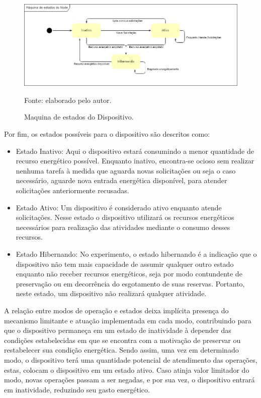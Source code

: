 \begin{figure}[H]
	\centering
	
	\caption{Maquina de estados do Dispositivo.}
	\label{fig:cap6maquinaestados}
	\noindent\includegraphics[width=0.75\linewidth]{Imagens/cap6/cap6maquinaestados.jpg} 
	
	Fonte: elaborado pelo autor.
\end{figure}

Por fim, os estados possíveis para o dispositivo são descritos como:
\begin{itemize}
	\item Estado Inativo: Aqui o dispositivo estará consumindo a menor quantidade de recurso energético possível. Enquanto inativo, encontra-se ocioso sem realizar nenhuma tarefa à medida que aguarda novas solicitações ou seja o caso necessário, aguarde nova entrada energética disponível, para atender solicitações anteriormente recusadas.
	\item Estado Ativo: Um dispositivo é considerado ativo enquanto atende solicitações. Nesse estado o dispositivo utilizará os recursos energéticos necessários para realização das atividades mediante o consumo desses recursos. 
	\item Estado Hibernando: No experimento, o estado hibernando é a indicação que o dispositivo não tem mais capacidade de assumir qualquer outro estado enquanto não receber recursos energéticos, seja por modo contundente de preservação ou em decorrência do esgotamento de suas reservas. Portanto, neste estado, um dispositivo não realizará qualquer atividade.	
	
\end{itemize}

A relação entre modos de operação e estados deixa implícita presença do mecanismo limitante e atuação implementada em cada modo, contribuindo para que o dispositivo permaneça em um estado de inatividade à depender das condições estabelecidas em que se encontra com a motivação de preservar ou restabelecer sua condição energética. Sendo assim, uma vez em determinado modo, o dispositivo terá uma quantidade potencial de atendimento das operações, estas, colocam o dispositivo em um estado ativo. Caso atinja valor limitador do modo, novas operações passam a ser negadas, e por sua vez, o dispositivo entrará em inatividade, reduzindo seu gasto energético.


